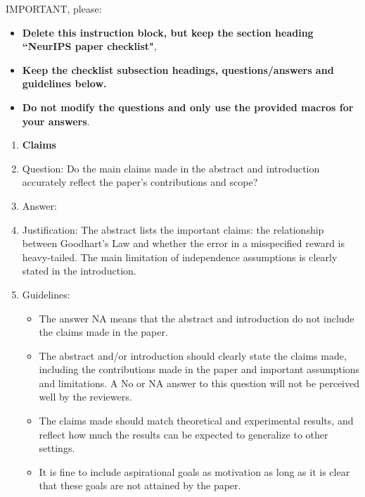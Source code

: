 \documentclass{article}
\begin{document}
IMPORTANT, please:
\begin{itemize}
    \item {\bf Delete this instruction block, but keep the section heading ``NeurIPS paper checklist"},
    \item  {\bf Keep the checklist subsection headings, questions/answers and guidelines below.}
    \item {\bf Do not modify the questions and only use the provided macros for your answers}.
\end{itemize} 
 



\begin{enumerate}

\item {\bf Claims}
    \item[] Question: Do the main claims made in the abstract and introduction accurately reflect the paper's contributions and scope?
    \item[] Answer: \answerYes{} %
    \item[] Justification: The abstract lists the important claims: the relationship between Goodhart's Law and whether the error in a misspecified reward is heavy-tailed. The main limitation of independence assumptions is clearly stated in the introduction.
    \item[] Guidelines:
    \begin{itemize}
        \item The answer NA means that the abstract and introduction do not include the claims made in the paper.
        \item The abstract and/or introduction should clearly state the claims made, including the contributions made in the paper and important assumptions and limitations. A No or NA answer to this question will not be perceived well by the reviewers. 
        \item The claims made should match theoretical and experimental results, and reflect how much the results can be expected to generalize to other settings. 
        \item It is fine to include aspirational goals as motivation as long as it is clear that these goals are not attained by the paper. 
    \end{itemize}


\end{enumerate}
\end{document}
